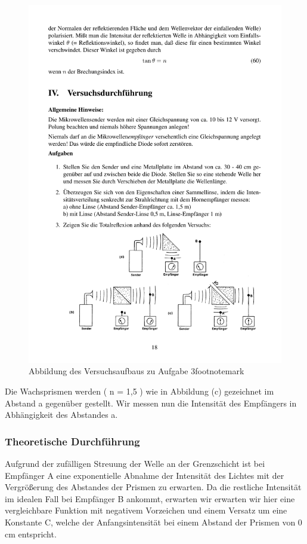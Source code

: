\documentclass[12pt]{scrartcl}
\begin{document}
\begin{figure}[H] 
  \centering
    \includegraphics[trim = 0mm 15mm 0mm 132mm, clip, scale = 1]{totalreflexion.pdf}
  	\caption[Abbildung des Versuchsaufbaus zu Aufgabe 3]{Abbildung des Versuchsaufbaus zu Aufgabe 3footnotemark}
  \label{fig:abb_versuch_3}
\end{figure}

Die Wachsprismen werden ( n = 1,5 ) wie in Abbildung (c) gezeichnet im Abstand a gegenüber gestellt. Wir messen nun die Intensität des Empfängers in Abhängigkeit des Abstandes a.
\subsubsection{Theoretische Durchführung}
Aufgrund der zufälligen Streuung der Welle an der Grenzschicht ist bei Empfänger A eine exponentielle Abnahme der Intensität des Lichtes mit der Vergrößerung des Abstandes der Prismen zu erwarten. Da die restliche Intensität im idealen Fall bei Empfänger B ankommt, erwarten wir erwarten wir hier eine vergleichbare Funktion mit negativem Vorzeichen und einem Versatz um eine Konstante C, welche der Anfangsintensität bei einem Abstand der Prismen von 0 cm entspricht.
\end{document}
